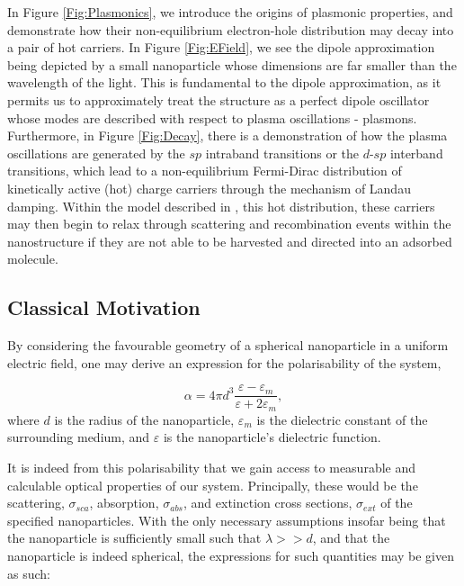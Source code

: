 In Figure \ref{Fig:Plasmonics}, we introduce the origins of plasmonic properties, and demonstrate how their non-equilibrium electron-hole distribution may decay into a pair of hot carriers. In Figure \ref{Fig:EField}, we see the dipole approximation being depicted by a small nanoparticle whose dimensions are far smaller than the wavelength of the light. This is fundamental to the dipole approximation, as it permits us to approximately treat the structure as a perfect dipole oscillator whose modes are described with respect to plasma oscillations - plasmons. Furthermore, in Figure \ref{Fig:Decay}, there is a demonstration of how the plasma oscillations are generated by the $sp$ intraband transitions or the $d$-$sp$ interband transitions, which lead to a non-equilibrium Fermi-Dirac distribution of kinetically active (hot) charge carriers through the mechanism of Landau damping. Within the model described in \cite{AuPlasmonRev}, this hot distribution, these carriers may then begin to relax through scattering and recombination events within the nanostructure if they are not able to be harvested and directed into an adsorbed molecule.

\subsection{Classical Motivation}
\label{sec:class_plasma}

By considering the favourable geometry of a spherical nanoparticle in a uniform electric field, one may derive an expression for the polarisability of the system,

\begin{equation}
    \alpha = 4\pi d^{3}\frac{\varepsilon - \varepsilon_{m}}{\varepsilon + 2\varepsilon_{m}},
    \label{eqn:polarise}
\end{equation}
where $d$ is the radius of the nanoparticle, $\varepsilon_{m}$ is the dielectric constant of the surrounding medium, and $\varepsilon$ is the nanoparticle's dielectric function.

It is indeed from this polarisability that we gain access to measurable and calculable optical properties of our system. Principally, these would be the scattering, $\sigma_{sca}$, absorption, $\sigma_{abs}$, and extinction cross sections, $\sigma_{ext}$ of the specified nanoparticles. With the only necessary assumptions insofar being that the nanoparticle is sufficiently small such that $\lambda >> d$, and that the nanoparticle is indeed spherical, the expressions for such quantities may be given as such:

